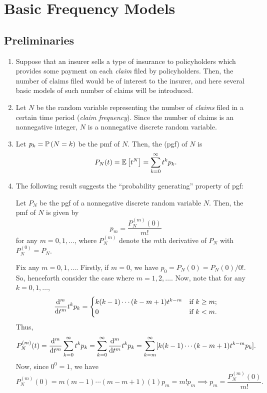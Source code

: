 \section{Basic Frequency Models}
\label{sect:freq-model}
\subsection{Preliminaries}
\begin{enumerate}
\item Suppose that an insurer  sells a type of insurance to
policyholders which provides some payment  on each
\emph{claim}  filed by policyholders. Then, the
number of claims filed would be of interest to the insurer, and here several
basic models of such number of claims will be introduced.


\item Let \(N\) be the random variable representing the number of \emph{claims}
 filed in a certain time period (\emph{claim frequency}).
Since the number of claims is an nonnegative integer, \(N\) is a nonnegative
discrete random variable.

\item Let \(p_k=\mathbb{P}\left(N=k\right)\) be the pmf of \(N\). Then, the  (pgf) of \(N\) is
\[
P_N(t)=\mathbb{E}\left[t^N\right]=\sum_{k=0}^{\infty}t^kp_k.
\]
\item The following result suggests the ``probability generating'' property of
pgf:
\begin{proposition}
\label{prp:pgf-gen-prob}
Let \(P_N\) be the pgf of a nonnegative discrete random variable \(N\). Then,
the pmf of \(N\) is given by
\[
p_m=\frac{P_N^{(m)}(0)}{m!}
\]
for any \(m=0,1,\dotsc\), where \(P_N^{(m)}\) denote the \(m\)th derivative of
\(P_N\) with \(P_N^{(0)}=P_N\).
\end{proposition}
\begin{pf}
Fix any \(m=0,1,\dotsc\). Firstly, if \(m=0\), we have \(
p_0=P_N(0)=P_N(0)/0!\). So, henceforth consider the case where \(m=1,2,\dotsc\).
Now, note that for any \(k=0,1,\dotsc\),
\[
\dv[m]{}{t}t^kp_k
=\begin{cases}
k(k-1)\dotsb(k-m+1)t^{k-m}&\text{if \(k\ge m\)};\\
0&\text{if \(k<m\)}.
\end{cases}
\]
Thus,
\[
P_N^{(m)}(t)=\dv[m]{}{t}\sum_{k=0}^{\infty}t^kp_k
=\sum_{k=0}^{\infty}\dv[m]{}{t}t^kp_k
=\sum_{k=m}^{\infty}[k(k-1)\dotsb(k-m+1)t^{k-m}p_k].
\]
Now, since \(0^{0}=1\), we have
\[
P_N^{(m)}(0)=m(m-1)\dotsb(m-m+1)(1)p_m
=m!p_m\implies p_m=\frac{P_N^{(m)}(0)}{m!}.
\]
\end{pf}


\end{enumerate}
